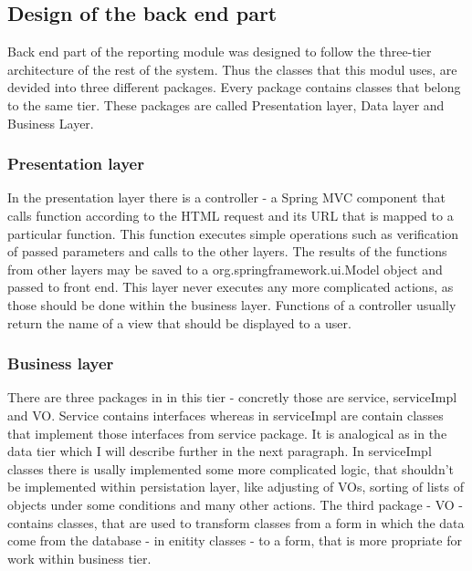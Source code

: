 \documentclass[thesis=B,english]{FITthesis}[2012/10/20]
\begin{document}


\subsection{Design of the back end part}
Back end part of the reporting module was designed to follow the three-tier architecture of the rest of the system. Thus the classes that this modul uses, are devided into three different packages. Every package contains classes that belong to the same tier. These packages are called Presentation layer, Data layer and Business Layer.

\subsubsection{Presentation layer}
In the presentation layer there is a controller - a Spring MVC component that calls function according to the  HTML request and its URL that is mapped to a particular function. This function executes simple operations such as verification of passed parameters and calls to the other layers. The results of the functions from other layers may be saved to a org.springframework.ui.Model object and passed to front end. This layer never executes any more complicated actions, as those should be done within the business layer. Functions of a controller usually return the name of a view that should be displayed to a user.
\subsubsection{Business layer}
There are three packages in in this tier - concretly those are service, serviceImpl and VO. Service contains interfaces whereas in serviceImpl are contain classes that implement those interfaces from service package. It is analogical as in the data tier which I will describe further in the next paragraph.
In serviceImpl classes there is usally implemented some more complicated logic, that shouldn't be implemented within persistation layer, like adjusting of VOs, sorting of lists of objects under some conditions and many other actions.
The third package - VO - contains classes, that are used to transform classes from a form in which the data come from the database - in enitity classes - to a form, that is more propriate for work within business tier.
\end{document}
